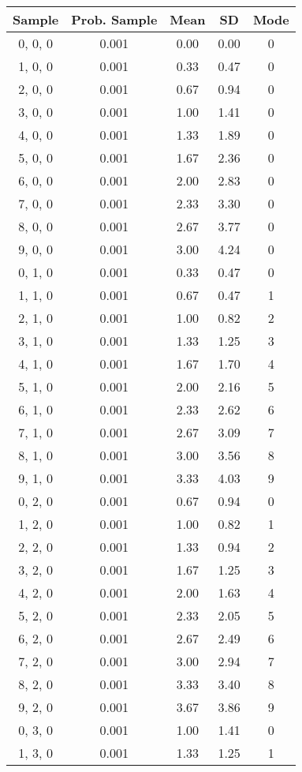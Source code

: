\documentclass[12pt]{article}
\begin{document}
\begin{tabular}{c || c || c | c | c}
Sample & Prob. Sample & Mean & SD & Mode\\
\hline
0, 0, 0 & 0.001 & 0.00 & 0.00 & 0 \\
1, 0, 0 & 0.001 & 0.33 & 0.47 & 0 \\
2, 0, 0 & 0.001 & 0.67 & 0.94 & 0 \\
3, 0, 0 & 0.001 & 1.00 & 1.41 & 0 \\
4, 0, 0 & 0.001 & 1.33 & 1.89 & 0 \\
5, 0, 0 & 0.001 & 1.67 & 2.36 & 0 \\
6, 0, 0 & 0.001 & 2.00 & 2.83 & 0 \\
7, 0, 0 & 0.001 & 2.33 & 3.30 & 0 \\
8, 0, 0 & 0.001 & 2.67 & 3.77 & 0 \\
9, 0, 0 & 0.001 & 3.00 & 4.24 & 0 \\
0, 1, 0 & 0.001 & 0.33 & 0.47 & 0 \\
1, 1, 0 & 0.001 & 0.67 & 0.47 & 1 \\
2, 1, 0 & 0.001 & 1.00 & 0.82 & 2 \\
3, 1, 0 & 0.001 & 1.33 & 1.25 & 3 \\
4, 1, 0 & 0.001 & 1.67 & 1.70 & 4 \\
5, 1, 0 & 0.001 & 2.00 & 2.16 & 5 \\
6, 1, 0 & 0.001 & 2.33 & 2.62 & 6 \\
7, 1, 0 & 0.001 & 2.67 & 3.09 & 7 \\
8, 1, 0 & 0.001 & 3.00 & 3.56 & 8 \\
9, 1, 0 & 0.001 & 3.33 & 4.03 & 9 \\
0, 2, 0 & 0.001 & 0.67 & 0.94 & 0 \\
1, 2, 0 & 0.001 & 1.00 & 0.82 & 1 \\
2, 2, 0 & 0.001 & 1.33 & 0.94 & 2 \\
3, 2, 0 & 0.001 & 1.67 & 1.25 & 3 \\
4, 2, 0 & 0.001 & 2.00 & 1.63 & 4 \\
5, 2, 0 & 0.001 & 2.33 & 2.05 & 5 \\
6, 2, 0 & 0.001 & 2.67 & 2.49 & 6 \\
7, 2, 0 & 0.001 & 3.00 & 2.94 & 7 \\
8, 2, 0 & 0.001 & 3.33 & 3.40 & 8 \\
9, 2, 0 & 0.001 & 3.67 & 3.86 & 9 \\
0, 3, 0 & 0.001 & 1.00 & 1.41 & 0 \\
1, 3, 0 & 0.001 & 1.33 & 1.25 & 1 \\

\end{tabular}
\end{document}
